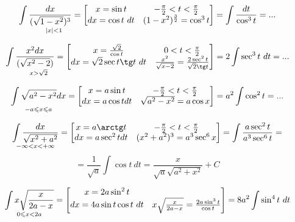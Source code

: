 \documentclass[main]{subfiles}
\begin{document}
    \begin{Example}
        \[\underset{\qquad |x|<1}{\int \frac{dx}{(\sqrt{1 - x^2})^3}} = \left[\begin{matrix}
            x = \sin t & -\frac{\pi}{2} < t < \frac{\pi}{2}\\
            dx = \cos t\ dt & (1-x^2)^{\frac{3}{2}} = \cos^3 t
        \end{matrix}\right] = \int \frac{dt}{\cos^3 t} = ...\]
    \end{Example}

    \begin{Example}
        \[\us{\qq x>\sqrt{2}}{\int \frac{x^2 dx}{(\sqrt{x^2 - 2})}} = \left[\begin{matrix}
            x = \frac{\sqrt{2}}{\cos t} & 0 < t < \frac{\pi}{2}\\
            dx = \sqrt{2} \sec t \tg t\ dt & \frac{x^2}{\sqrt{x-2}} = \frac{2 \sec^2 t}{\sqrt{2} \tg t}
        \end{matrix}\right] = 2 \int \sec^3 t\ dt = ...\]
    \end{Example}

    \begin{Example}
        \[\underset{-a \leqslant x \leqslant a}{\int \sqrt{a^2 - x^2} dx} = \left[\begin{matrix}
            x = a\sin t & -\frac{\pi}{2} < t < \frac{\pi}{2}\\
            dx = a\cos t dt & \sqrt{a^2 - x^2} = a \cos x
        \end{matrix}\right] = a^2 \int \cos^2 t = ...\]
    \end{Example}

    \begin{Example}[фокус]
        \[\us{-\infty < x < +\infty}{\int \frac{dx}{\sqrt{x^2 + a^2}}} = \left[\begin{matrix}
            x = a\arctg t & -\frac{\pi}{2} < t < \frac{\pi}{2}\\
            dx = a\sec^2 t dt & (x^2 + a^2)^3 = a^3 \sec^6 x
        \end{matrix}\right] = \int \frac{a \sec^2 t}{a^3 \sec^6 t} =\]
        \[= \frac{1}{\sqrt{a}} \int \cos t\ dt = \frac{x}{\sqrt{a} \sqrt{a^2 + x^2}} + C\]
    \end{Example}

    \begin{Example}
        \[\underset{0 \leqslant x < 2a}{\int x \sqrt{\frac{x}{2a-x}}} = \left[\begin{matrix}
            x = 2a \sin^2 t & \\
            dx = 4a \sin t \cos t\ dt & x \sqrt{\frac{x}{2a - x}} = \frac{2a\sin^3 t}{\cos t}
        \end{matrix}\right] = 8a^2 \int \sin^4 t\ dt\]
    \end{Example}
\end{document}

